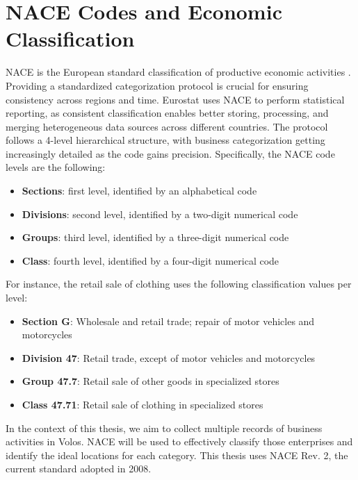 \section{NACE Codes and Economic Classification}

NACE is the European standard classification of productive economic activities \cite{nace2008}. Providing a standardized categorization protocol is crucial for ensuring consistency across regions and time. Eurostat uses NACE to perform statistical reporting, as consistent classification enables better storing, processing, and merging heterogeneous data sources across different countries. The protocol follows a 4-level hierarchical structure, with business categorization getting increasingly detailed as the code gains precision. Specifically, the NACE code levels are the following: 

\begin{itemize} 
    \item \textbf{Sections}: first level, identified by an alphabetical code 
    \item \textbf{Divisions}: second level, identified by a two-digit numerical code 
    \item \textbf{Groups}: third level, identified by a three-digit numerical code 
    \item \textbf{Class}: fourth level, identified by a four-digit numerical code 
\end{itemize}

\noindent For instance, the retail sale of clothing uses the following classification values per level:

\begin{itemize}
    \item \textbf{Section G}: Wholesale and retail trade; repair of motor vehicles and motorcycles
    \item \textbf{Division 47}: Retail trade, except of motor vehicles and motorcycles
    \item \textbf{Group 47.7}: Retail sale of other goods in specialized stores
    \item \textbf{Class 47.71}: Retail sale of clothing in specialized stores
\end{itemize}

In the context of this thesis, we aim to collect multiple records of business activities in Volos. NACE will be used to effectively classify those enterprises and identify the ideal locations for each category. This thesis uses NACE Rev. 2, the current standard adopted in 2008.



